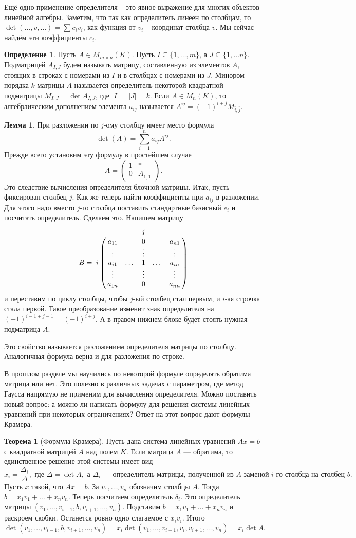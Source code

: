 \documentclass[10pt,a4paper,oneside]{book}
\theoremstyle{definition}
\newtheorem*{defn}{\color{yellow!30!red} Определение}
\newtheorem{thm}{\color{red!40!black}Теорема}
\newtheorem{lem}{\color{green!50!black}Лемма}
\newcommand{\ovl}{\overline}
\def\thrm{\begin{thm}}
\def\ethrm{\end{thm}}
\def\dfn{\begin{defn}}
\def\edfn{\end{defn}}
\def\lm{\begin{lem}}
\def\elm{\end{lem}}
\def\pmat{\begin{pmatrix}}
\def\epmat{\end{pmatrix}}
\begin{document}
Ещё одно применение определителя -- это явное выражение для многих объектов линейной алгебры. Заметим, что так как определитель линеен по столбцам, то $\det (\dots,v,\dots)= \sum c_i v_i$, как функция от $v_i$ -- координат  столбца $v$. Мы сейчас найдём эти коэффициенты $c_i$.

\dfn Пусть $A \in M_{m\times n}(K)$. Пусть $I\subseteq \{1,\dots,m\}$, а $J\subseteq \{1,\dots n\}$. Подматрицей $A_{I,J}$ будем называть матрицу, составленную из элементов $A$, стоящих в строках с номерами из $I$ и в столбцах с номерами из $J$. Минором порядка $k$ матрицы $A$ называется определитель некоторой квадратной подматрицы $M_{I,J}=\det A_{I,J}$, где $|I|=|J|=k$. Если $A\in M_n(K)$, то алгебраическим дополнением элемента $a_{ij}$ называется $A^{ij}=(-1)^{i+j} M_{\ovl{i},\ovl{j}}$.
\edfn



\lm При разложении по $j$-ому столбцу имеет место формула  $$\det(A)=\sum_{i=1}^n a_{ij} A^{ij}.$$
\proof Прежде всего установим эту формулу в простейшем случае $$A=\pmat 1& *\\
0& A_{\ovl{1},\ovl{1}}\epmat. $$
Это следствие вычисления определителя блочной матрицы. Итак, пусть фиксирован столбец $j$. Как же теперь найти коэффициенты при $a_{ij}$ в разложении. Для этого надо вместо $j$-го столбца поставить стандартные базисный $e_i$ и посчитать определитель. Сделаем это. Напишем матрицу
$$B= \bordermatrix{
 & &       &  j &      & \cr
 & a_{11} && 0 &  & a_{n1}    \cr
 & \vdots& & \vdots& & \vdots\cr
 i &a_{i1}&\dots & 1 &\dots & a_{in} \cr
 & \vdots& & \vdots& & \vdots\cr
 & a_{1n} &  & 0 &      &a_{nn} } $$
и переставим по циклу столбцы, чтобы $j$-ый столбец стал первым, и $i$-ая строчка стала первой. Такое преобразование изменит знак определителя на $(-1)^{i-1+j-1}=(-1)^{i+j}$. А в правом нижнем блоке будет стоять нужная подматрица $A$.
\endproof
\elm
Это свойство называется разложением  определителя матрицы  по столбцу. Аналогичная формула верна и для разложения по строке.


В прошлом разделе мы научились по некоторой формуле определять обратима матрица или нет. Это полезно в различных задачах с параметром, где метод Гаусса напрямую не применим для вычисления определителя. Можно поставить новый вопрос: а можно ли написать формулу для решения системы линейных уравнений при некоторых ограничениях? Ответ на  этот вопрос дают формулы Крамера.

\thrm[Формула Крамера]
Пусть дана система линейных уравнений $Ax=b$ с квадратной матрицей $A$ над полем $K$. Если матрица $A$ --- обратима, то единственное решение этой системы имеет вид $$x_i=\frac{\Delta_i}{\Delta}, \text{ где } \Delta=\det A, \text{ а } \Delta_i \text{ --- определитель матрицы, полученной из  $A$ заменой $i$-го столбца на столбец $b$}.$$
\proof Пусть $x$ такой, что $Ax=b$. За $v_1,\dots,v_n$ обозначим столбцы $A$. Тогда $b=x_1v_1+\dots+x_nv_n$.  Теперь посчитаем определитель $\delta_i$. Это определитель матрицы $(v_1,\dots,v_{i-1},b,v_{i+1},\dots,v_n)$. Подставим $b=x_1v_1+\dots+x_nv_n$ и раскроем скобки. Останется ровно одно слагаемое с $x_iv_i$. Итого
$$\det (v_1,\dots,v_{i-1},b,v_{i+1},\dots,v_n)= x_i \det(v_1,\dots,v_{i-1},v_i,v_{i+1},\dots,v_n)=x_i\det A.$$
\endproof
\ethrm
\end{document}
